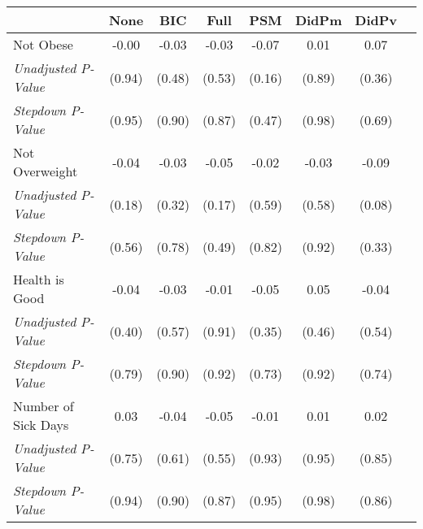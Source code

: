 \begin{tabular}{l c c c c c c c}
\toprule
 & None & BIC & Full & PSM & DidPm & DidPv \\
\midrule
Not Obese & -0.00 & -0.03 & -0.03 & -0.07 & 0.01 & 0.07 \\
\quad \textit{Unadjusted P-Value} & (0.94) & (0.48) & (0.53) & (0.16) & (0.89) & (0.36) \\
\quad \textit{Stepdown P-Value} & (0.95) & (0.90) & (0.87) & (0.47) & (0.98) & (0.69) \\
Not Overweight & -0.04 & -0.03 & -0.05 & -0.02 & -0.03 & -0.09 \\
\quad \textit{Unadjusted P-Value} & (0.18) & (0.32) & (0.17) & (0.59) & (0.58) & (0.08) \\
\quad \textit{Stepdown P-Value} & (0.56) & (0.78) & (0.49) & (0.82) & (0.92) & (0.33) \\
Health is Good & -0.04 & -0.03 & -0.01 & -0.05 & 0.05 & -0.04 \\
\quad \textit{Unadjusted P-Value} & (0.40) & (0.57) & (0.91) & (0.35) & (0.46) & (0.54) \\
\quad \textit{Stepdown P-Value} & (0.79) & (0.90) & (0.92) & (0.73) & (0.92) & (0.74) \\
Number of Sick Days & 0.03 & -0.04 & -0.05 & -0.01 & 0.01 & 0.02 \\
\quad \textit{Unadjusted P-Value} & (0.75) & (0.61) & (0.55) & (0.93) & (0.95) & (0.85) \\
\quad \textit{Stepdown P-Value} & (0.94) & (0.90) & (0.87) & (0.95) & (0.98) & (0.86) \\
\bottomrule
\end{tabular}
